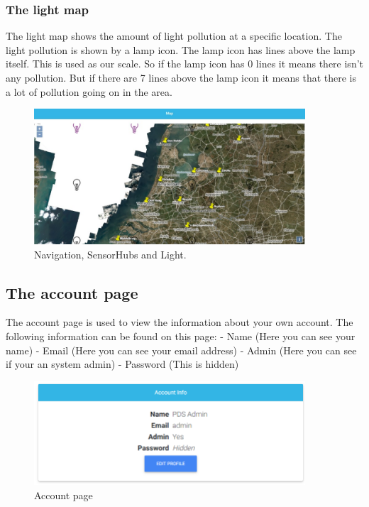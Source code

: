 \documentclass[a4paper]{article}
\begin{document}
\subsubsection{The light map}
The light map shows the amount of light pollution at a specific location. The light pollution is shown by a lamp icon. The lamp icon has lines above the lamp itself. This is used as our scale. So if the lamp icon has 0 lines it means there isn't any pollution. But if there are 7 lines above the lamp icon it means that there is a lot of pollution going on in the area.
\begin{figure}[h!]
  \caption{Navigation, SensorHubs and Light.}
  \centering
  \includegraphics[width=0.9\textwidth]{lightmap}
\end{figure}
\newline

\newpage
\subsection{The account page}
The account page is used to view the information about your own account.
\newline
The following information can be found on this page:
\newline
- Name (Here you can see your name)
\newline
- Email (Here you can see your email address)
\newline
- Admin (Here you can see if your an system admin)
\newline
- Password (This is hidden)
\newline

\begin{figure}[h!]
  \caption{Account page}
  \centering
  \includegraphics[width=0.9\textwidth]{account}
\end{figure}
\end{document}
